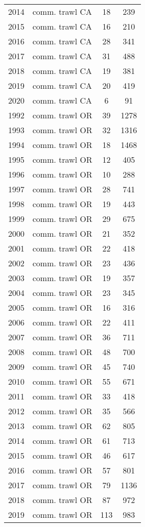 \begin{longtable}[t]{c>{\centering\arraybackslash}p{4cm}cc}
2014 & comm. trawl CA & 18 & 239\\
2015 & comm. trawl CA & 16 & 210\\
2016 & comm. trawl CA & 28 & 341\\
2017 & comm. trawl CA & 31 & 488\\
2018 & comm. trawl CA & 19 & 381\\
2019 & comm. trawl CA & 20 & 419\\
2020 & comm. trawl CA & 6 & 91\\
1992 & comm. trawl OR & 39 & 1278\\
1993 & comm. trawl OR & 32 & 1316\\
1994 & comm. trawl OR & 18 & 1468\\
1995 & comm. trawl OR & 12 & 405\\
1996 & comm. trawl OR & 10 & 288\\
1997 & comm. trawl OR & 28 & 741\\
1998 & comm. trawl OR & 19 & 443\\
1999 & comm. trawl OR & 29 & 675\\
2000 & comm. trawl OR & 21 & 352\\
2001 & comm. trawl OR & 22 & 418\\
2002 & comm. trawl OR & 23 & 436\\
2003 & comm. trawl OR & 19 & 357\\
2004 & comm. trawl OR & 23 & 345\\
2005 & comm. trawl OR & 16 & 316\\
2006 & comm. trawl OR & 22 & 411\\
2007 & comm. trawl OR & 36 & 711\\
2008 & comm. trawl OR & 48 & 700\\
2009 & comm. trawl OR & 45 & 740\\
2010 & comm. trawl OR & 55 & 671\\
2011 & comm. trawl OR & 33 & 418\\
2012 & comm. trawl OR & 35 & 566\\
2013 & comm. trawl OR & 62 & 805\\
2014 & comm. trawl OR & 61 & 713\\
2015 & comm. trawl OR & 46 & 617\\
2016 & comm. trawl OR & 57 & 801\\
2017 & comm. trawl OR & 79 & 1136\\
2018 & comm. trawl OR & 87 & 972\\
2019 & comm. trawl OR & 113 & 983\\

\end{longtable}
